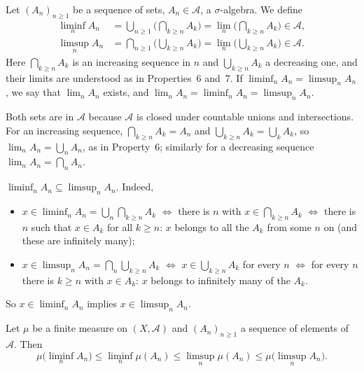 \begin{definition}\label{def:ms-liminf-limsup}
Let $(A_n)_{n\ge1}$ be a sequence of sets, $A_n\in\mathcal A$, a $\sigma$-algebra. We define
\begin{align*}
  \liminf_nA_n&=\bigcup_{n\ge1}\Big(\bigcap_{k\ge n}A_k\Big)=\lim_n\Big(\bigcap_{k\ge n}A_k\Big)\in\mathcal A,\\
  \limsup_nA_n&=\bigcap_{n\ge1}\Big(\bigcup_{k\ge n}A_k\Big)=\lim_n\Big(\bigcup_{k\ge n}A_k\Big)\in\mathcal A.
\end{align*}
Here $\bigcap_{k\ge n}A_k$ is an increasing sequence in $n$ and $\bigcup_{k\ge n}A_k$ a
decreasing one, and their limits are understood as in Properties~6 and~7. If
$\liminf_nA_n=\limsup_nA_n$, we say that $\lim_nA_n$ exists, and
$\lim_nA_n=\liminf_nA_n=\limsup_nA_n$.
\end{definition}

Both sets are in $\mathcal A$ because $\mathcal A$ is closed under countable unions and
intersections. For an increasing sequence, $\bigcap_{k\ge n}A_k=A_n$ and
$\bigcup_{k\ge n}A_k=\bigcup_kA_k$, so $\lim_nA_n=\bigcup_nA_n$, as in Property~6; similarly
for a decreasing sequence $\lim_nA_n=\bigcap_nA_n$.

\begin{remark}\label{rem:ms-liminf-subset}
$\liminf_nA_n\subseteq\limsup_nA_n$. Indeed,
\begin{itemize}
  \item $x\in\liminf_nA_n=\bigcup_n\bigcap_{k\ge n}A_k$ $\iff$ there is $n$ with
    $x\in\bigcap_{k\ge n}A_k$ $\iff$ there is $n$ such that $x\in A_k$ for all $k\ge n$: $x$
    belongs to all the $A_k$ from some $n$ on (and these are infinitely many);
  \item $x\in\limsup_nA_n=\bigcap_n\bigcup_{k\ge n}A_k$ $\iff$ $x\in\bigcup_{k\ge n}A_k$ for
    every $n$ $\iff$ for every $n$ there is $k\ge n$ with $x\in A_k$: $x$ belongs to
    infinitely many of the $A_k$.
\end{itemize}
So $x\in\liminf_nA_n$ implies $x\in\limsup_nA_n$.
\end{remark}

\begin{proposition}\label{prop:ms-liminf-limsup}
Let $\mu$ be a finite measure on $(X,\mathcal A)$ and $(A_n)_{n\ge1}$ a sequence of elements
of $\mathcal A$. Then
\[
  \mu\Big(\liminf_nA_n\Big)\le\liminf_n\mu(A_n)\le\limsup_n\mu(A_n)\le\mu\Big(\limsup_nA_n\Big).
\]
\end{proposition}

